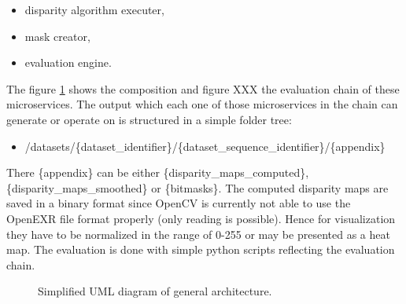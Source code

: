 \begin{itemize}
  \item disparity algorithm executer,
  \item mask creator,
  \item evaluation engine.
\end{itemize}

\noindent The figure \ref{fig:overview-uml} shows the composition and figure XXX the evaluation chain of these microservices.
The output which each one of those microservices in the chain can generate or operate on is structured in a simple folder tree:

\begin{itemize}
  \item /datasets/\{dataset\_identifier\}/\{dataset\_sequence\_identifier\}/\{appendix\}
\end{itemize}

\noindent There \{appendix\} can be either \{disparity\_maps\_computed\}, \{disparity\_maps\_smoothed\} or \{bitmasks\}.
\newline\newline\noindent The computed disparity maps are saved in a binary format since OpenCV is currently not able to use the OpenEXR file format properly (only reading is possible).
Hence for visualization they have to be normalized in the range of 0-255 or may be presented as a heat map.
The evaluation is done with simple python scripts reflecting the evaluation chain.

\begin{figure}[h!]
  \centering
  \caption{Simplified UML diagram of general architecture.}
  \label{fig:overview-uml}
\end{figure}

